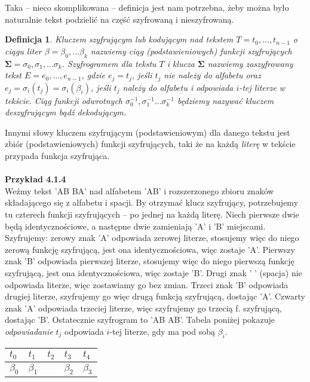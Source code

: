 \documentclass[a4paper]{article}
\theoremstyle{defn}
\newtheorem{defn}{Definicja}[subsection]
\theoremstyle{theorem}
\theoremstyle{lemma}
\theoremstyle{cor}
\theoremstyle{fact}
\begin{document}
Taka – nieco skomplikowana – definicja jest nam potrzebna, żeby można było naturalnie tekst podzielić na część szyfrowaną i nieszyfrowaną.
\begin{defn}\label{defn4.1.4}
\textit{Kluczem szyfrującym} lub \textit{kodującym} nad tekstem $T = t_0, ..., t_{n-1}$ o ciągu liter $\beta = \beta_0, ... \beta_{k}$ nazwiemy ciąg (podstawieniowych) funkcji szyfrujących $\boldsymbol{\Sigma} = \sigma_0, \sigma_1, ... \sigma_k$. \textit{Szyfrogramem} dla tekstu $T$ i klucza $\boldsymbol{\Sigma}$ nazwiemy zaszyfrowany tekst $E = e_0, ..., e_{n-1}$, gdzie $e_j = t_j$, jeśli $t_j$ nie należy do alfabetu oraz $e_j = \sigma_i(t_j) = \sigma_i(\beta_i)$, jeśli $t_j$ należy do alfabetu i odpowiada $i$-tej literze w tekście. Ciąg funkcji odwrotnych $\sigma_0^{-1}, \sigma_1^{-1} ... \sigma_k^{-1}$ będziemy nazywać \textit{kluczem deszyfrującym} bądź \textit{dekodującym}.
\end{defn}
Innymi słowy kluczem szyfrującym (podstawieniowym) dla danego tekstu jest zbiór (podstawieniowych) funkcji szyfrujących, taki że na każdą \textit{literę} w tekście przypada funkcja szyfrująca. \\\\
\textbf{Przykład 4.1.4}\\
Weźmy tekst 'AB BA' nad alfabetem 'AB' i rozszerzonego zbioru znaków składającego się z alfabetu i spacji. By otrzymać klucz szyfrujący, potrzebujemy tu czterech funkcji szyfrujących – po jednej na każdą literę. Niech pierwsze dwie będą identycznościowe, a następne dwie zamieniają 'A' i 'B' miejscami. Szyfrujemy: zerowy znak 'A' odpowiada zerowej literze, stosujemy więc do niego zerową funkcję szyfrującą, jest ona identycznościowa, więc zostaje 'A'. Pierwszy znak 'B' odpowiada pierwszej literze, stosujemy więc do niego pierwszą funkcję szyfrującą, jest ona identycznościowa, więc zostaje 'B'. Drugi znak ' ' (spacja) nie odpowiada literze, więc zostawiamy go bez zmian. Trzeci znak 'B' odpowiada drugiej literze, szyfrujemy go więc drugą funkcją szyfrującą, dostając 'A'. Czwarty znak 'A' odpowiada trzeciej literze, więc szyfrujemy go trzecią f. szyfrującą, dostając 'B'. Ostatecznie szyfrogram to 'AB AB'. Tabela poniżej pokazuje \textit{odpowiadanie} $t_j$ odpowiada $i$-tej literze, gdy ma pod sobą $\beta_i$.
\begin{center}\begin{tabular}{|p{1.5mm}|p{1.5mm}|p{1.5mm}|p{1.5mm}|p{1.5mm}|}
    $t_0$ & $t_1$ & $t_2$ & $t_3$ & $t_4$ \\ \hline
    $\beta_0$ & $\beta_1$ & & $\beta_2$ & $\beta_3$
\end{tabular}
\end{center}
\end{document}
